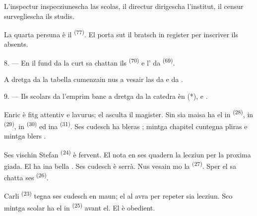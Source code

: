 L'inspectur inspecziunescha las scolas, il directur dirigescha l'institut, il
censur survegliescha ils studis.

La quarta persuna è il  \textsuperscript{(77)}. El porta sut il
bratsch in register per inscriver ils absents.

8. --- En il fund da la curt sa chattan ils 
\textsuperscript{(70)} e l' da 
\textsuperscript{(69)}.

A dretga da la tabella cumenzain nus a vesair las  da 
e da .


\VUsaut{2.4mm}

\VUsaut{3.0mm}

9. --- Ils scolars da l'emprim banc a dretga da la catedra èn  (*),
 e .

Enric è fitg attentiv e lavurus; el asculta il magister. Sin sia maisa ha el in
 \textsuperscript{(28)}, in  \textsuperscript{(29)},
in  \textsuperscript{(30)} ed ina 
\textsuperscript{(31)}. Ses cudesch ha bleras ; mintga chapitel
cuntegna pliras  e mintga  blers .

Ses vischin Stefan \textsuperscript{(24)} è fervent. El nota en ses quadern la
lecziun per la proxima giada. El ha ina bella . Ses cudesch è
serrà. Nus vesain mo la  \textsuperscript{(27)}. Sper el sa chatta
ses  \textsuperscript{(26)}.

Carli \textsuperscript{(23)} tegna ses cudesch en maun; el al avra per repeter sia
lecziun. Sco mintga scolar ha el in  \textsuperscript{(25)}
avant el. El è obedient.

